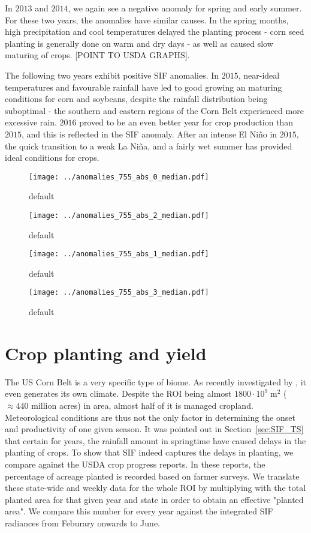 \documentclass[review, a4paper, 10pt, times]{elsarticle}
\begin{document}
In $2013$ and $2014$, we again see a negative anomaly for spring and early summer. For these two years, the anomalies have similar causes. In the spring months, high precipitation and cool temperatures delayed the planting process - corn seed planting is generally done on warm and dry days - as well as caused slow maturing of crops. [POINT TO USDA GRAPHS].

The following two years exhibit positive SIF anomalies. In $2015$, near-ideal temperatures and favourable rainfall have led to good growing an maturing conditions for corn and soybeans, despite the rainfall distribution being suboptimal - the southern and eastern regions of the Corn Belt experienced more excessive rain. $2016$ proved to be an even better year for crop production than $2015$, and this is reflected in the SIF anomaly. After an intense El Ni\~no in $2015$, the quick transition to a weak La Ni\~na, and a fairly wet summer has provided ideal conditions for crops.


\begin{figure}[htbp]
\centering
\texttt{[image: ../anomalies\_755\_abs\_0\_median.pdf]}
\caption{default}
\label{fig:anomalies_0}
\end{figure}

\begin{figure}[htbp]
\centering
\texttt{[image: ../anomalies\_755\_abs\_2\_median.pdf]}
\caption{default}
\label{fig:anomalies_2}
\end{figure}


\begin{figure}[htbp]
\centering
\texttt{[image: ../anomalies\_755\_abs\_1\_median.pdf]}
\caption{default}
\label{fig:anomalies_1}
\end{figure}

\begin{figure}[htbp]
\centering
\texttt{[image: ../anomalies\_755\_abs\_3\_median.pdf]}
\caption{default}
\label{fig:anomalies_3}
\end{figure}

\section{Crop planting and yield}

The US Corn Belt is a very specific type of biome. As recently investigated by \citet{Alter2017}, it even generates its own climate. Despite the ROI being almost $1800 \cdot 10^9\;\mathrm{m}^2$ ($\approx 440$ million acres) in area, almost half of it is managed cropland. Meteorological conditions are thus not the only factor in determining the onset and productivity of one given season. It was pointed out in Section~\ref{sec:SIF_TS} that certain for years, the rainfall amount in springtime have caused delays in the planting of crops. To show that SIF indeed captures the delays in planting, we compare against the USDA crop progress reports. In these reports, the percentage of acreage planted is recorded based on farmer surveys. We translate these state-wide and weekly data for the whole ROI by multiplying with the total planted area for that given year and state in order to obtain an effective "planted area". We compare this number for every year against the integrated SIF radiances from Feburary onwards to June.
\end{document}
